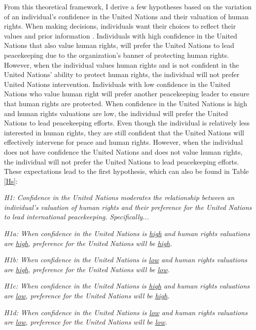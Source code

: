 \documentclass[12pt]{article}
\newcommand{\UN}[1]{United Nations}
\begin{document}
From this theoretical framework, I derive a few hypotheses based on the variation of an individual's confidence in the \UN{} and their valuation of human rights. When making decisions, individuals want their choices to reflect their values and prior information \citep{simmons2006intuitive}. Individuals with high confidence in the \UN{} that also value human rights, will prefer the \UN{} to lead peacekeeping due to the organization's banner of protecting human rights. However, when the individual values human rights and is not confident in the \UN{}' ability to protect human rights, the individual will not prefer \UN{} intervention. Individuals with low confidence in the \UN{} who value human right will prefer another peacekeeping leader to ensure that human rights are protected. When confidence in the \UN{} is high and human rights valuations are low, the individual will prefer the \UN{} to lead peacekeeping efforts. Even though the individual is relatively less interested in human rights, they are still confident that the \UN{} will effectively intervene for peace and human rights. However, when the individual does not have confidence the \UN{} and does not value human rights, the individual will not prefer the \UN{} to lead peacekeeping efforts. These expectations lead to the first hypothesis, which can also be found in Table \ref{Hs}:

\begin{center}
\begin{singlespace}
\textit{H1: Confidence in the United Nations moderates the relationship between an individual's valuation of human rights and their preference for the United Nations to lead international peacekeeping. Specifically... }
\vspace{0.2cm}
\par \textit{H1a: When confidence in the \UN{} is \underline{high} and human rights valuations are \underline{high}, preference for the \UN{} will be \underline{high}.}
\vspace{0.2cm}
\par \textit{H1b: When confidence in the \UN{} is \underline{low} and human rights valuations are \underline{high}, preference for the \UN{} will be \underline{low}.}
\vspace{0.2cm}
\par \textit{H1c: When confidence in the \UN{} is \underline{high} and human rights valuations are \underline{low}, preference for the \UN{} will be \underline{high}.}
\vspace{0.2cm}
\par \textit{H1d: When confidence in the \UN{} is \underline{low} and human rights valuations are \underline{low}, preference for the \UN{} will be \underline{low}.}
\end{singlespace}
\end{center}
\end{document}
